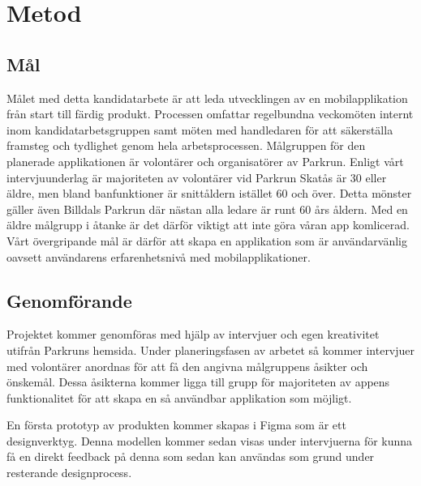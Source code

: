 \section{Metod}




\subsection{Mål}
Målet med detta kandidatarbete är att leda utvecklingen av en mobilapplikation från start till färdig produkt. Processen omfattar regelbundna veckomöten internt inom kandidatarbetsgruppen samt möten med handledaren för att säkerställa framsteg och tydlighet genom hela arbetsprocessen. Målgruppen för den planerade applikationen är volontärer och organisatörer av Parkrun. Enligt vårt intervjuunderlag är majoriteten av volontärer vid Parkrun Skatås är 30 eller äldre, men bland banfunktioner är snittåldern istället 60 och över. Detta mönster gäller även Billdals Parkrun där nästan alla ledare är runt 60 års åldern. Med en äldre målgrupp i åtanke är det därför viktigt att inte göra våran app komlicerad. Vårt övergripande mål är därför att skapa en applikation som är användarvänlig oavsett användarens erfarenhetsnivå med mobilapplikationer.



\subsection{Genomförande}

Projektet kommer genomföras med hjälp av intervjuer och egen kreativitet utifrån Parkruns hemsida. 
Under planeringsfasen av arbetet så kommer intervjuer med volontärer anordnas för att få den angivna målgruppens åsikter och önskemål. 
Dessa åsikterna kommer ligga till grupp för majoriteten av appens funktionalitet för att skapa en så användbar applikation som möjligt. 

En första prototyp av produkten kommer skapas i Figma som är ett designverktyg. Denna modellen kommer sedan visas under intervjuerna för 
kunna få en direkt feedback på denna som sedan kan användas som grund under resterande designprocess.


